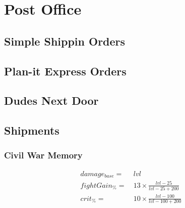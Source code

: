 \chapter{Post Office}
    \section{Simple Shippin Orders}

    \section{Plan-it Express Orders}

    \section{Dudes Next Door}

    \newpage
    \section{Shipments}
    \begin{center}
    \end{center}
    \subsection{Civil War Memory}

        \begin{align*}
            damage_{base} = &\  lvl
            \\
            fightGain_\% = &\   13 \times \frac{{lvl}-25}{{lvl}-25+200}
            \\
            crit_\% = &\  10 \times \frac{{lvl}-100}{{lvl}-100+200}
        \end{align*}


